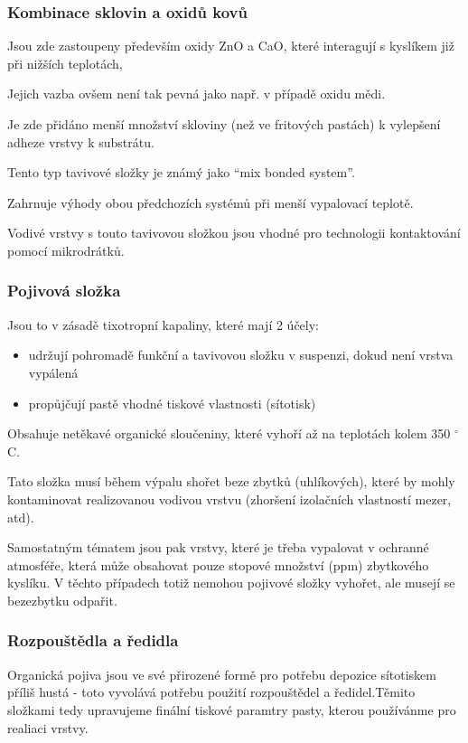\subsubsection*{Kombinace sklovin a oxidů kovů}

Jsou zde zastoupeny především oxidy ZnO a CaO, které interagují s kyslíkem již při
nižších teplotách,

Jejich vazba ovšem není tak pevná jako např. v případě oxidu mědi.

Je zde přidáno menší množství skloviny (než ve fritových pastách) k vylepšení
adheze vrstvy k substrátu.

Tento typ tavivové složky je známý jako “mix bonded system”.

Zahrnuje výhody obou předchozích systémů při menší vypalovací teplotě.

Vodivé vrstvy s touto tavivovou složkou jsou vhodné pro technologii kontaktování
pomocí mikrodrátků.

\subsubsection{Pojivová složka}

Jsou to v zásadě tixotropní kapaliny, které mají 2 účely:
\begin{itemize}
\item udržují pohromadě funkční a tavivovou složku v
suspenzi, dokud není vrstva vypálená
\item propůjčují pastě vhodné tiskové vlastnosti (sítotisk)
\end{itemize}

Obsahuje netěkavé organické sloučeniny, které vyhoří až na teplotách kolem 350 $^{\circ}$C.

Tato složka musí během výpalu shořet beze zbytků (uhlíkových), které by mohly
kontaminovat realizovanou vodivou vrstvu (zhoršení izolačních vlastností mezer, atd).

Samostatným tématem jsou pak vrstvy, které je třeba vypalovat v ochranné atmosféře,
která může obsahovat pouze stopové množství (ppm) zbytkového kyslíku. V těchto
případech totiž nemohou pojivové složky vyhořet, ale musejí se bezezbytku odpařit.

\subsubsection*{Rozpouštědla a ředidla}
 Organická pojiva jsou ve své přirozené formě pro potřebu depozice sítotiskem příliš hustá - toto
vyvolává potřebu použití rozpouštědel a ředidel.Těmito složkami tedy upravujeme finální tiskové paramtry pasty, kterou používánme pro
realiaci vrstvy.

